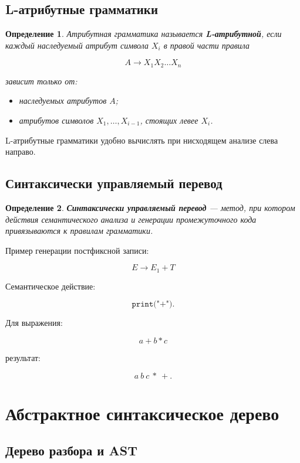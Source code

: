 \documentclass[12pt,a4paper]{article}
\newtheorem{definition}{Определение}
\begin{document}
\subsection{L-атрибутные грамматики}

\begin{definition}
Атрибутная грамматика называется \textbf{L-атрибутной}, если каждый наследуемый атрибут символа $X_i$ в правой части правила

\[
A \to X_1X_2\ldots X_n
\]

зависит только от:
\begin{itemize}
    \item наследуемых атрибутов $A$;
    \item атрибутов символов $X_1,\ldots,X_{i-1}$, стоящих левее $X_i$.
\end{itemize}
\end{definition}

L-атрибутные грамматики удобно вычислять при нисходящем анализе слева направо.

\subsection{Синтаксически управляемый перевод}

\begin{definition}
\textbf{Синтаксически управляемый перевод} --- метод, при котором действия семантического анализа и генерации промежуточного кода привязываются к правилам грамматики.
\end{definition}

Пример генерации постфиксной записи:

\[
E \to E_1 + T
\]

Семантическое действие:

\[
\texttt{print("+")}.
\]

Для выражения:

\[
a+b*c
\]

результат:

\[
a\ b\ c\ *\ +.
\]

\section{Абстрактное синтаксическое дерево}

\subsection{Дерево разбора и AST}
\end{document}
